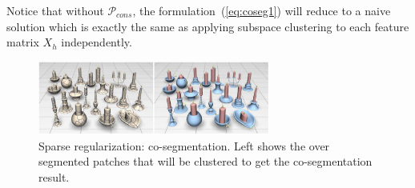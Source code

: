 Notice that without $\mathcal{P}_{cons}$, the formulation~(\ref{eq:coseg1}) will reduce to a naive solution which is exactly the same as applying subspace clustering to each feature matrix $X_{h}$ independently.

\begin{figure}[ht]
  \centering
  \includegraphics[width=3in]{images/co-segmentation}
  \caption{Sparse regularization: co-segmentation\cite{hu2012co}. Left shows the over segmented patches that will be clustered to get the co-segmentation result.}
  \label{fig:co-segmentation}
\end{figure}

